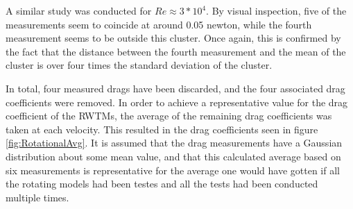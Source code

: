 


A similar study was conducted for $Re \approx 3*10^4$. By visual inspection, five of the measurements seem to coincide at around 0.05 \si{newton}, while the fourth measurement seems to be outside this cluster. Once again, this is confirmed by the fact that the distance between the fourth measurement and the mean of the cluster is over four times the standard deviation of the cluster. 


In total, four measured drags have been discarded, and the four associated drag coefficients were removed. In order to achieve a representative value for the drag coefficient of the \gls{RWTM}s, the average of the remaining drag coefficients was taken at each velocity. This resulted in the drag coefficients seen in figure \ref{fig:RotationalAvg}. It is assumed that the drag measurements have a Gaussian distribution about some mean value, and that this calculated average based on six measurements is representative for the average one would have gotten if all the rotating models had been testes and all the tests had been conducted multiple times.  


